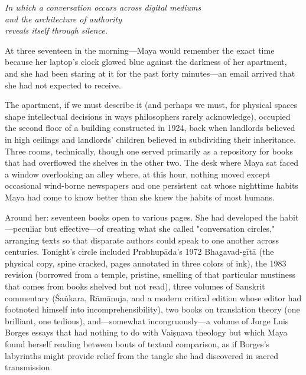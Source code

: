 \documentclass[12pt,twoside]{book}
\begin{document}
{\centering\itshape In which a conversation occurs across digital mediums\\and the architecture of authority\\reveals itself through silence.\par}
\vspace{0.3cm}

\normalfont\justifying
At three seventeen in the morning—Maya would remember the exact time because her laptop's clock glowed blue against the darkness of her apartment, and she had been staring at it for the past forty minutes—an email arrived that she had not expected to receive.

The apartment, if we must describe it (and perhaps we must, for physical spaces shape intellectual decisions in ways philosophers rarely acknowledge), occupied the second floor of a building constructed in 1924, back when landlords believed in high ceilings and landlords' children believed in subdividing their inheritance. Three rooms, technically, though one served primarily as a repository for books that had overflowed the shelves in the other two. The desk where Maya sat faced a window overlooking an alley where, at this hour, nothing moved except occasional wind-borne newspapers and one persistent cat whose nighttime habits Maya had come to know better than she knew the habits of most humans.

Around her: seventeen books open to various pages. She had developed the habit—peculiar but effective—of creating what she called "conversation circles," arranging texts so that disparate authors could speak to one another across centuries. Tonight's circle included Prabhupāda's 1972 Bhagavad-gītā (the physical copy, spine cracked, pages annotated in three colors of ink), the 1983 revision (borrowed from a temple, pristine, smelling of that particular mustiness that comes from books shelved but not read), three volumes of Sanskrit commentary (Śaṅkara, Rāmānuja, and a modern critical edition whose editor had footnoted himself into incomprehensibility), two books on translation theory (one brilliant, one tedious), and—somewhat incongruously—a volume of Jorge Luis Borges essays that had nothing to do with Vaiṣṇava theology but which Maya found herself reading between bouts of textual comparison, as if Borges's labyrinths might provide relief from the tangle she had discovered in sacred transmission.
\end{document}

